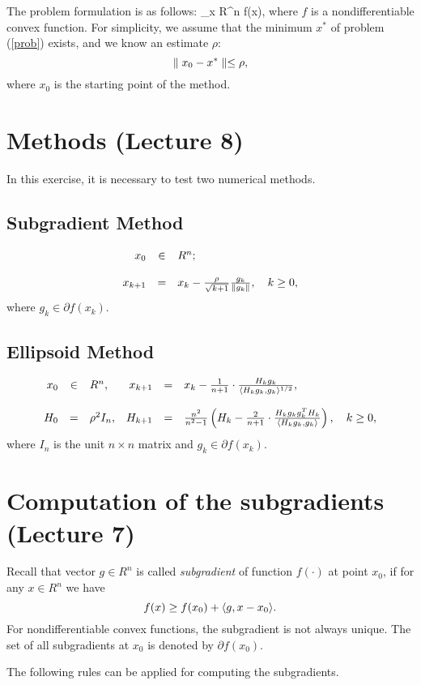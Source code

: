 The problem formulation is as follows:
\beq\label{prob}
\min\limits_{x \in R^n} \; f(x),
\eeq
where
$f$ is a nondifferentiable convex function.
\BA
For simplicity, we assume that the minimum $x^*$ of
problem (\ref{prob}) exists, and we know an estimate
$\rho$:
$$
\N x_0 - x^* \N \leq \rho,
$$
where $x_0$ is the starting point of the method.
\EA

\section{Methods (Lecture 8)}

In this exercise, it is necessary to test two numerical
methods.

\subsection{Subgradient Method}
$$
\ba{rcl}
x_0 & \in & R^n;\\
\\
x_{k+1} & = & x_k - {\rho \over \sqrt{k+1}}{g_k \over \|
g_k \| },
\quad k \geq 0,
\ea
$$
where $g_k \in \partial f(x_k)$.

\subsection{Ellipsoid Method}
$$
\ba{rclrcl}
x_0 & \in & R^n, & x_{k+1} & = & x_k - {1 \over n + 1}
\cdot { H_k g_k \over \la H_k g_k, g_k \ra^{1/2}},\\
\\
H_0 & = & \rho^2 I_n, & H_{k+1} & = & {n^2 \over n^2 - 1}
\left(H_k - { 2 \over n + 1} \cdot { H_k g_k g_k^T H_k
\over \la H_k g_k, g_k \ra }\right), \quad k \geq 0,
\ea
$$
where $I_n$ is the unit $n \times n$ matrix and
$g_k \in \partial f(x_k)$.

\section{Computation of the subgradients (Lecture 7)}\label{sc-set}

Recall that vector $g \in R^n$ is called {\em subgradient}
of function $f(\cdot)$ at point $x_0$, if for any $x \in
R^n$ we have
$$
f(x) \geq f(x_0) + \la g, x - x_0 \ra.
$$
For nondifferentiable convex functions, the subgradient is
not always unique. The set of all subgradients at $x_0$ is
denoted by $\partial f(x_0)$.

The following rules can be applied for computing the
subgradients.

